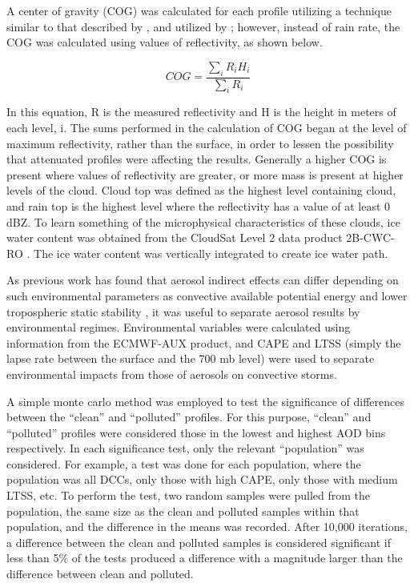 A center of gravity (COG) was calculated for each profile utilizing a technique similar to that described by \citet{Koren:2009p8934}, and utilized by \citet{Heiblum:2012p8926}; however, instead of rain rate, the COG was calculated using values of reflectivity, as shown below.

\begin{equation}
COG=\frac {\sum _{i}R_{i}H_{i}} {\sum _{i}R_{i}}
\end{equation}

In this equation, R is the measured reflectivity and H is the height in meters of each level, i.  The sums performed in the calculation of COG began at the level of maximum reflectivity, rather than the surface, in order to lessen the possibility that attenuated profiles were affecting the results.  Generally a higher COG is present where values of reflectivity are greater, or more mass is present at higher levels of the cloud.
\newpage
Cloud top was defined as the highest level containing cloud, and rain top is the highest level where the reflectivity has a value of at least 0 dBZ.  To learn something of the microphysical characteristics of these clouds, ice water content was obtained from the CloudSat Level 2 data product 2B-CWC-RO \citep{Austin:2009p4345}.  The ice water content was vertically integrated to create ice water path.  

As previous work has found that aerosol indirect effects can differ depending on such environmental parameters as convective available potential energy \citep[CAPE, e.g.][]{Storer:2010p8001} and lower tropospheric static stability \citep[LTSS, e.g.][]{Matsui:2004p761}, it was useful to separate aerosol results by environmental regimes.  Environmental variables were calculated using information from the ECMWF-AUX product, and CAPE and LTSS (simply the lapse rate between the surface and the 700 mb level) were used to separate environmental impacts from those of aerosols on convective storms.

A simple monte carlo method was employed to test the significance of differences between the ``clean'' and ``polluted'' profiles.  For this purpose, ``clean'' and ``polluted'' profiles were considered those in the lowest and highest AOD bins respectively.  In each significance test, only the relevant  ``population'' was considered.  For example, a test was done for each population, where the population was all DCCs, only those with high CAPE, only those with medium LTSS, etc.
To perform the test, two random samples were pulled from the population, the same size as the clean and polluted samples within that population, and the difference in the means was recorded.  After 10,000 iterations, a difference between the clean and polluted samples is considered significant if less than 5\% of the tests produced a difference with a magnitude larger than the difference between clean and polluted.


